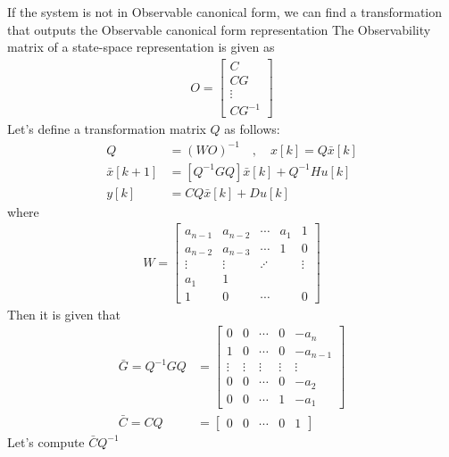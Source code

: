 \documentclass[twoside]{article}
\begin{document}
If the system is not in Observable canonical form, we can find a
transformation that outputs the Observable canonical form
representation
%
The Observability matrix of a state-space representation is given as
%
\begin{align*}
 O = \left[ \begin{array}{c} C \\ C G \\ \vdots \\ C G^{-1} \end{array} \right]
\end{align*}
%
Let's define a transformation matrix $Q$ as follows:
%
\begin{align*}
  Q &= \left( W O \right)^{-1} \quad , \quad x[k] = Q \bar{x}[k]
\\
 \bar{x}[k+1] &= \left[ Q^{-1} G Q \right] \bar{x}[k] + Q^{-1} H u[k]
\\ 
  y[k] &= C Q \bar{x}[k] + D u[k]
\end{align*}
%
where
%
\begin{align*}
  W = \left[ \begin{array}{ccccc} a_{n-1} & a_{n-2} & \cdots & a_1 & 1
               \\ 
a_{n-2} & a_{n-3} & \cdots & 1 & 0
\\ \vdots & \vdots & \iddots & & \vdots
\\ a_1 & 1 &  & & 
    \\ 1 & 0 & \cdots &  & 0 \end{array} \right] 
\end{align*}
%
Then it is given that
%
\begin{align*}
  \bar{G} = Q^{-1} G Q  &=  \left[ \begin{array}{ccccc} 0 & 0 & \cdots & 0 & -a_{n} 
              \\ 1 & 0 & \cdots & 0 & -a_{n-1} 
\\ \vdots & \vdots & \vdots & \vdots & \vdots
\\ 0 & 0 & \cdots & 0 & -a_2
    \\ 0 & 0 & \cdots & 1 & -a_1 \end{array} \right]
\\
  \bar{C}  = C Q & = \left[ \begin{array}{ccccc} 0 & 0 & \cdots & 0
    & 1 \end{array} \right]
\end{align*}
%
Let's compute $\bar{C} Q^{-1}$
%
\end{document}
